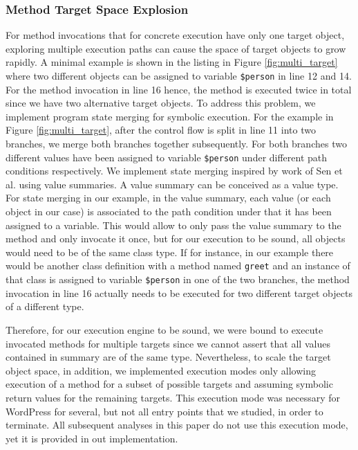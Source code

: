 \documentclass[sigconf]{acmart}
\renewcommand{\tt}[1]{\texttt{#1}}
\begin{document}
\subsubsection{Method Target Space Explosion}
For method invocations that for concrete execution have only one target object,
exploring multiple execution paths can cause the space of target objects to
grow rapidly. A minimal example is shown in the listing in Figure
\ref{fig:multi_target} where two different objects can be assigned to variable \tt{\$person} in line 12 and
14. For the method invocation in line 16 hence, the method is executed twice in
total since we have two alternative target objects. To address this problem, we
implement program state merging for symbolic execution. For the example in
Figure \ref{fig:multi_target}, after the control flow is split in line 11 into
two branches, we merge both branches together subsequently. For both branches two different
values have been assigned to variable \tt{\$person} under different path
conditions respectively. We implement state merging inspired by work of Sen et al. 
\cite{Sen:2015:MMS:2786805.2786830} using value summaries. A value summary can be conceived as a value
type. For state merging in our example, in the value summary, each value (or
each object in our case) is associated to the path condition under that it has
been assigned to a variable. This would allow to only pass the value summary to
the method and only invocate it once, but for our execution to be sound, all
objects would need to be of the same class type. If for instance, in our
example there would be another class definition with a method named
\tt{greet} and an instance of that class is assigned to variable \tt{\$person}
in one of the two branches, the method invocation in line 16 actually needs to be
executed for two different target objects of a different type.

Therefore, for our execution engine to be sound, we were bound to execute
invocated methods for multiple targets since we cannot assert that all values
contained in summary are of the same type. Nevertheless, to scale the target
object space, in addition, we implemented execution modes only allowing
execution of a method for a subset of possible targets and assuming symbolic
return values for the remaining targets. This execution mode was necessary for
WordPress for several, but not all entry points that we studied, in order to
terminate. All subsequent analyses in this paper do not use this execution
mode, yet it is provided in out implementation.
\end{document}
